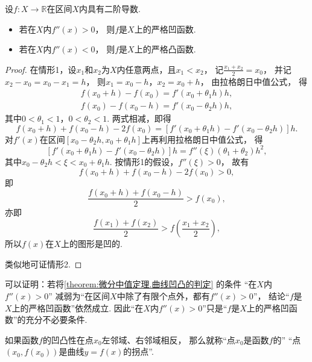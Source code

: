 \begin{theorem}[曲线凹凸的判定]\label{theorem:微分中值定理.曲线凹凸的判定}
设\(f\colon X\to\mathbb{R}\)在区间\(X\)内具有二阶导数.
\begin{itemize}
	\item 若在\(X\)内\(f''(x)>0\)，
	则\(f\)是\(X\)上的严格凹函数.
	\item 若在\(X\)内\(f''(x)<0\)，
	则\(f\)是\(X\)上的严格凸函数.
\end{itemize}
\begin{proof}
在情形1，设\(x_1\)和\(x_2\)为\(X\)内任意两点，且\(x_1 < x_2\)，
记\(\frac{x_1 + x_2}{2} = x_0\)，
并记\(x_2 - x_0 = x_0 - x_1 = h\)，
则\(x_1 = x_0 - h\)，\(x_2 = x_0 + h\)，
由拉格朗日中值公式，
得\begin{gather*}
	f(x_0 + h) - f(x_0) = f'(x_0 + \theta_1 h) h, \\
	f(x_0) - f(x_0 - h) = f'(x_0 - \theta_2 h) h,
\end{gather*}
其中\(0 < \theta_1 < 1\)，\(0 < \theta_2 < 1\).
两式相减，即得\[
	f(x_0 + h) + f(x_0 - h) - 2 f(x_0)
	= [ f'(x_0 + \theta_1 h) - f'(x_0 - \theta_2 h) ] h.
\]
对\(f'(x)\)在区间\([x_0 - \theta_2 h,x_0 + \theta_1 h]\)上再利用拉格朗日中值公式，
得\[
	[ f'(x_0 + \theta_1 h) - f'(x_0 - \theta_2 h) ] h
	= f''(\xi) (\theta_1 + \theta_2) h^2,
\]
其中\(x_0 - \theta_2 h < \xi < x_0 + \theta_1 h\).
按情形1的假设，\(f''(\xi) > 0\)，
故有\[
	f(x_0 + h) + f(x_0 - h) - 2 f(x_0) > 0,
\]
即\[
	\frac{f(x_0 + h) + f(x_0 - h)}{2} > f(x_0),
\]
亦即\[
	\frac{f(x_1) + f(x_2)}{2} > f\left(\frac{x_1 + x_2}{2}\right),
\]
所以\(f(x)\)在\(X\)上的图形是凹的.

类似地可证情形2.
\end{proof}
\end{theorem}
\begin{remark}
可以证明：若将\cref{theorem:微分中值定理.曲线凹凸的判定} 的条件
“在\(X\)内\(f''(x)>0\)”
减弱为“在区间\(X\)中除了有限个点外，都有\(f''(x)>0\)”，
结论“\(f\)是\(X\)上的严格凹函数”依然成立.
因此“在\(X\)内\(f''(x)>0\)”只是“\(f\)是\(X\)上的严格凹函数”的充分不必要条件.
\end{remark}

\begin{definition}
如果函数\(f\)的凹凸性在点\(x_0\)左邻域、右邻域相反，
那么就称“点\(x_0\)是函数\(f\)的”
“点\((x_0,f(x_0))\)是曲线\(y=f(x)\)的拐点”.
\end{definition}

